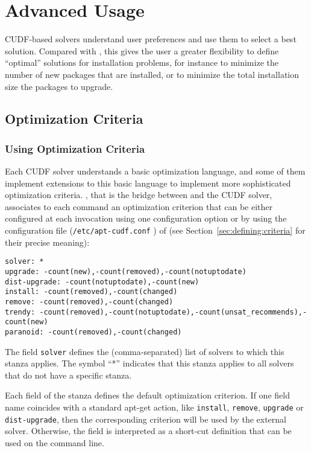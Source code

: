 \section{Advanced Usage}

CUDF-based solvers understand user preferences and use them to select
a best solution. Compared with \aptget, this gives the user a greater
flexibility to define ``optimal'' solutions for installation problems,
for instance to minimize the number of new packages that are
installed, or to minimize the total installation size the packages to
upgrade.

\subsection{Optimization Criteria}

\subsubsection{Using Optimization Criteria}

Each CUDF solver understands a basic optimization language, and some of
them implement extensions to this basic language to implement more
sophisticated optimization criteria. \aptcudf, that is the bridge
between \aptget{} and the CUDF solver, associates to each \aptget{}
command an optimization criterion that can be either configured at
each invocation using one \aptget{} configuration option or by using
the configuration file (\texttt{/etc/apt-cudf.conf} ) of \aptcudf{}
(see Section~\ref{sec:defining:criteria} for their precise meaning):

\begin{verbatim}
solver: *
upgrade: -count(new),-count(removed),-count(notuptodate)
dist-upgrade: -count(notuptodate),-count(new)
install: -count(removed),-count(changed)
remove: -count(removed),-count(changed)
trendy: -count(removed),-count(notuptodate),-count(unsat_recommends),-count(new)
paranoid: -count(removed),-count(changed)
\end{verbatim}

The field \texttt{solver} defines the (comma-separated) list of solvers
to which this stanza applies. The symbol ``*'' indicates that this
stanza applies to all solvers that do not have a specific stanza.

Each field of the stanza defines the default optimization criterion.
If one field name coincides with a standard apt-get action, like
\texttt{install}, \texttt{remove}, \texttt{upgrade} or \texttt{dist-upgrade},
then the corresponding
criterion will be used by the external solver. Otherwise, the field is
interpreted as a short-cut definition that can be used on the
\aptget{} command line.

